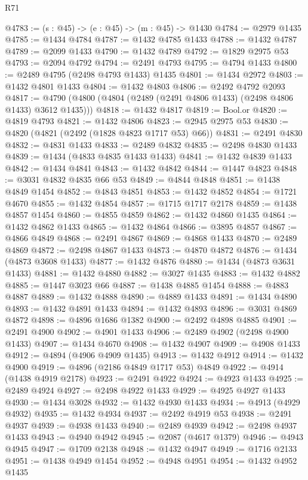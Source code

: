 \begin{lexlean}{R71}
\begin{coremodule}
@4783 := (s : @45) -> (e : @45) -> (m : @45) -> @1430
@4784 := @2979 @1435
@4785 := @1434 @4784
@4787 := @1432 @4785 @1433
@4788 := @1432 @4787
@4789 := @2099 @1433
@4790 := @1432 @4789
@4792 := @1829 @2975 @53
@4793 := @2094 @4792
@4794 := @2491 @4793
@4795 := @4794 @1433
@4800 := @2489 @4795 (@2498 @4793 @1433) @1435
@4801 := @1434 @2972
@4803 := @1432 @4801 @1433
@4804 := @1432 @4803
@4806 := @2492 @4792 @2093
@4817 := @4790 (@4800 (@4804 (@2489 (@2491 @4806 @1433) (@2498 @4806 @1433) @3612 @1435)))
@4818 := @1432 @4817
@4819 := Bool.or
@4820 := @4819 @4793
@4821 := @1432 @4806
@4823 := @2945 @2975 @53
@4830 := @4820 (@4821 (@2492 (@1828 @4823 @1717 @53) @66))
@4831 := @2491 @4830
@4832 := @4831 @1433
@4833 := @2489 @4832
@4835 := @2498 @4830 @1433
@4839 := @1434 (@4833 @4835 @1433 @1433)
@4841 := @1432 @4839 @1433
@4842 := @1434 @4841
@4843 := @1432 @4842
@4844 := @1447 @4823
@4848 := @3031 @4832 @4835 @66 @53
@4849 := @4844 @4848
@4851 := @1438 @4849 @1454
@4852 := @4843 @4851
@4853 := @1432 @4852
@4854 := @1721 @4670
@4855 := @1432 @4854
@4857 := @1715 @1717 @2178
@4859 := @1438 @4857 @1454
@4860 := @4855 @4859
@4862 := @1432 @4860 @1435
@4864 := @1432 @4862 @1433
@4865 := @1432 @4864
@4866 := @3895 @4857
@4867 := @4866 @4849
@4868 := @2491 @4867
@4869 := @4868 @1433
@4870 := @2489 @4869
@4872 := @2498 @4867 @1433
@4873 := @4870 @4872
@4876 := @1434 (@4873 @3608 @1433)
@4877 := @1432 @4876
@4880 := @1434 (@4873 @3631 @1433)
@4881 := @1432 @4880
@4882 := @3027 @1435
@4883 := @1432 @4882
@4885 := @1447 @3023 @66
@4887 := @1438 @4885 @1454
@4888 := @4883 @4887
@4889 := @1432 @4888
@4890 := @4889 @1433
@4891 := @1434 @4890
@4893 := @1432 @4891 @1433
@4894 := @1432 @4893
@4896 := @3031 @4869 @4872
@4898 := @4896 @1686 @1382
@4900 := @2492 @4898 @4885
@4901 := @2491 @4900
@4902 := @4901 @1433
@4906 := @2489 @4902 (@2498 @4900 @1433)
@4907 := @1434 @4670
@4908 := @1432 @4907
@4909 := @4908 @1433
@4912 := @4894 (@4906 @4909 @1435)
@4913 := @1432 @4912
@4914 := @1432 @4900
@4919 := @4896 (@2186 @4849 @1717 @53) @4849
@4922 := @4914 (@1438 @4919 @2178)
@4923 := @2491 @4922
@4924 := @4923 @1433
@4925 := @2489 @4924
@4927 := @2498 @4922 @1433
@4929 := @4925 @4927 @1433
@4930 := @1434 @3028
@4932 := @1432 @4930 @1433
@4934 := @4913 (@4929 @4932)
@4935 := @1432 @4934
@4937 := @2492 @4919 @53
@4938 := @2491 @4937
@4939 := @4938 @1433
@4940 := @2489 @4939
@4942 := @2498 @4937 @1433
@4943 := @4940 @4942
@4945 := @2087 (@4617 @1379)
@4946 := @4943 @4945
@4947 := @1709 @2138
@4948 := @1432 @4947
@4949 := @1716 @2133
@4951 := @1438 @4949 @1454
@4952 := @4948 @4951
@4954 := @1432 @4952 @1435

\end{coremodule}
\end{lexlean}
